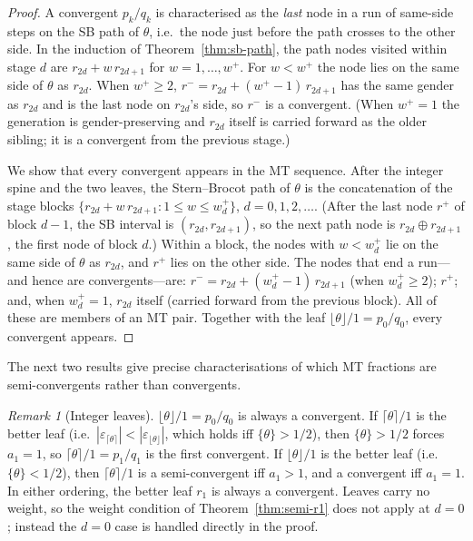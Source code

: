 \documentclass[12pt]{article}
\theoremstyle{definition}
\theoremstyle{remark}
\newtheorem{remark}[theorem]{Remark}
\theoremstyle{plain}
\begin{document}
\begin{proof}
A convergent $p_k/q_k$ is characterised as the \emph{last} node in a run of
same-side steps on the SB path of $\theta$, i.e.\ the node just before the path
crosses to the other side.
In the induction of Theorem~\ref{thm:sb-path}, the path nodes visited within
stage $d$ are $r_{2d} + w\,r_{2d+1}$ for $w = 1, \ldots, w^+$.
For $w < w^+$ the node lies on the same side of $\theta$ as $r_{2d}$.
When $w^+ \geq 2$, $r^- = r_{2d} + (w^+-1)\,r_{2d+1}$ has the same gender as
$r_{2d}$ and is the last node on $r_{2d}$'s side, so $r^-$ is a convergent.
(When $w^+ = 1$ the generation is gender-preserving and $r_{2d}$ itself is
carried forward as the older sibling; it is a convergent from the previous stage.)

We show that every convergent appears in the MT sequence.
After the integer spine and the two leaves, the Stern--Brocot path of $\theta$
is the concatenation of the stage blocks
$\{r_{2d} + w\,r_{2d+1} : 1 \le w \le w^+_d\}$, $d = 0, 1, 2, \ldots$.
(After the last node $r^+$ of block $d-1$, the SB interval is
$(r_{2d}, r_{2d+1})$, so the next path node is $r_{2d} \oplus r_{2d+1}$,
the first node of block $d$.)
Within a block, the nodes with $w < w^+_d$ lie on the same side of $\theta$ as
$r_{2d}$, and $r^+$ lies on the other side.
The nodes that end a run---and hence are convergents---are:
$r^- = r_{2d} + (w^+_d - 1)\,r_{2d+1}$ (when $w^+_d \ge 2$);
$r^+$;
and, when $w^+_d = 1$, $r_{2d}$ itself (carried forward from the previous block).
All of these are members of an MT pair.
Together with the leaf $\lfloor\theta\rfloor/1 = p_0/q_0$, every convergent appears.
\end{proof}

The next two results give precise characterisations of which MT fractions are
semi-convergents rather than convergents.

\begin{remark}[Integer leaves]
\label{rem:d0-leaves}
  $\lfloor\theta\rfloor/1 = p_0/q_0$ is always a convergent.
  If $\lceil\theta\rceil/1$ is the better leaf (i.e.\ $|\varepsilon_{\lceil\theta\rceil}| <
  |\varepsilon_{\lfloor\theta\rfloor}|$, which holds iff $\{\theta\} > 1/2$),
  then $\{\theta\} > 1/2$ forces $a_1 = 1$, so $\lceil\theta\rceil/1 = p_1/q_1$ is the
  first convergent.
  If $\lfloor\theta\rfloor/1$ is the better leaf (i.e.\ $\{\theta\} < 1/2$),
  then $\lceil\theta\rceil/1$ is a semi-convergent iff $a_1 > 1$, and a convergent iff
  $a_1 = 1$.
  In either ordering, the better leaf $r_1$ is always a convergent.
  Leaves carry no weight, so the weight condition of Theorem~\ref{thm:semi-r1}
  does not apply at $d = 0$; instead the $d = 0$ case is handled directly in the proof.
\end{remark}
\end{document}
